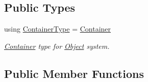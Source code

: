 \subsection*{Public Types}
\begin{DoxyCompactItemize}
\item 
using \hyperlink{classtvm_1_1runtime_1_1NDArray_abcb2ab5512d146d173e0aab86eee72a9}{Container\+Type} = \hyperlink{classtvm_1_1runtime_1_1NDArray_1_1Container}{Container}
\begin{DoxyCompactList}\small\item\em \hyperlink{classtvm_1_1runtime_1_1NDArray_1_1Container}{Container} type for \hyperlink{classtvm_1_1runtime_1_1Object}{Object} system. \end{DoxyCompactList}\end{DoxyCompactItemize}
\subsection*{Public Member Functions}
